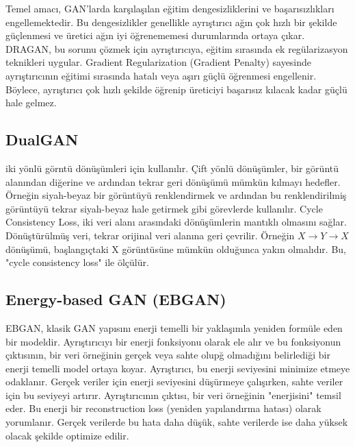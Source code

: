 Temel amacı, GAN'larda karşılaşılan eğitim dengesizliklerini ve başarısızlıkları engellemektedir. Bu dengesizlikler genellikle ayrıştırıcı ağın çok hızlı bir şekilde güçlenmesi ve üretici ağın iyi öğrenememesi durumlarında ortaya çıkar. DRAGAN, bu sorunu çözmek için ayrıştırıcıya, eğitim sırasında ek regülarizasyon teknikleri uygular.  Gradient Regularization (Gradient Penalty) sayesinde ayrıştırıcının eğitimi sırasında hatalı veya aşırı güçlü öğrenmesi engellenir. Böylece, ayrıştırıcı çok hızlı şekilde öğrenip üreticiyi başarısız kılacak kadar güçlü hale gelmez. 

\newpage

\subsection{DualGAN}

iki yönlü görntü dönüşümleri için kullanılır. Çift yönlü dönüşümler, bir görüntü alanından diğerine ve ardından tekrar geri dönüşümü mümkün kılmayı hedefler. Örneğin siyah-beyaz bir görüntüyü renklendirmek ve ardından bu renklendirilmiş görüntüyü tekrar siyah-beyaz hale getirmek gibi görevlerde kullanılır. Cycle Consistency Loss, iki veri alanı arasındaki dönüşümlerin mantıklı olmasını sağlar. Dönüştürülmüş veri, tekrar orijinal veri alanına geri çevrilir. Örneğin $X \rightarrow Y \rightarrow X$ dönüşümü, başlangıçtaki X görüntüsüne mümkün olduğunca yakın olmalıdır. Bu, "cycle consistency loss" ile ölçülür.

\newpage

\subsection{Energy-based GAN (EBGAN)}

EBGAN, klasik GAN yapısını enerji temelli bir yaklaşımla yeniden formüle eden bir modeldir. Ayrıştırıcıyı bir enerji fonksiyonu olarak ele alır ve bu fonksiyonun çıktısının, bir veri örneğinin gerçek veya sahte olupğ olmadığını belirlediği bir enerji temelli model ortaya koyar. Ayrıştırıcı, bu enerji seviyesini minimize etmeye odaklanır. Gerçek veriler için enerji seviyesini düşürmeye çalışırken, sahte veriler için bu seviyeyi artırır. Ayrıştırıcının çıktısı, bir veri örneğinin "enerjisini" temsil eder. Bu enerji bir reconstruction loss (yeniden yapılandırma hatası) olarak yorumlanır. Gerçek verilerde bu hata daha düşük, sahte verilerde ise daha yüksek olacak şekilde optimize edilir.

\newpage


